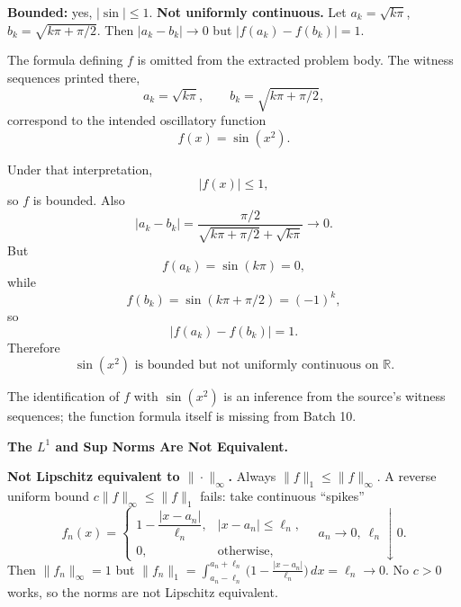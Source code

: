 \begin{problem}[CP-II-0173]
\label{prob:cp-ii-0173}
\textbf{Bounded:} yes, $|\sin|\le1$. \textbf{Not uniformly continuous.}
	Let $a_k=\sqrt{k\pi}$, $b_k=\sqrt{k\pi+\pi/2}$. Then $|a_k-b_k|\to0$ but
	$|f(a_k)-f(b_k)|=1$.
\end{problem}

\begin{solution}
The formula defining \(f\) is omitted from the extracted problem body. The witness sequences
printed there,
\[
a_k=\sqrt{k\pi},
\qquad
b_k=\sqrt{k\pi+\pi/2},
\]
correspond to the intended oscillatory function
\[
f(x)=\sin(x^2).
\]

Under that interpretation,
\[
|f(x)|\le1,
\]
so \(f\) is bounded. Also
\[
|a_k-b_k|
=
\frac{\pi/2}
{\sqrt{k\pi+\pi/2}+\sqrt{k\pi}}
\longrightarrow0.
\]
But
\[
f(a_k)=\sin(k\pi)=0,
\]
while
\[
f(b_k)
=
\sin(k\pi+\pi/2)
=
(-1)^k,
\]
so
\[
|f(a_k)-f(b_k)|=1.
\]
Therefore
\[
\boxed{
\sin(x^2)\text{ is bounded but not uniformly continuous on }\mathbb R.
}
\]

The identification of \(f\) with \(\sin(x^2)\) is an inference from the source's witness
sequences; the function formula itself is missing from Batch 10.
\end{solution}


\begin{problem}[CP-II-0175]
\label{prob:cp-ii-0175}
\textbf{The \(L^1\) and Sup Norms Are Not Equivalent.}

\hspace*{1.5em}\textbf{Not Lipschitz equivalent to $\|\cdot\|_{\infty}$.}
	Always $\|f\|_{1}\le \|f\|_{\infty}$. A reverse uniform bound
	$c\|f\|_{\infty}\le \|f\|_{1}$ fails: take continuous ``spikes''
	\[
	f_n(x)=\begin{cases}
		1-\dfrac{|x-a_n|}{\ell_n}, & |x-a_n|\le \ell_n,\\[4pt]
		0, & \text{otherwise},
	\end{cases}
	\quad a_n\to 0,\ \ell_n\downarrow 0.
	\]
	Then $\|f_n\|_{\infty}=1$ but $\|f_n\|_{1}=\int_{a_n-\ell_n}^{a_n+\ell_n}\!\!\big(1-\frac{|x-a_n|}{\ell_n}\big)\,dx
	=\ell_n\to 0$. No $c>0$ works, so the norms are not Lipschitz equivalent.
\end{problem}

